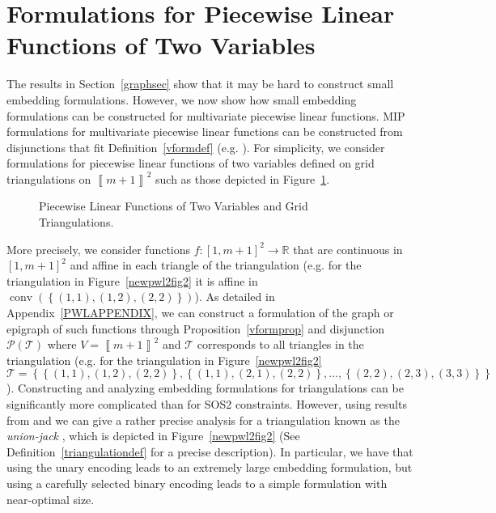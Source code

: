 \documentclass[mnsc]{informs3}
\newcommand{\set}[1]{\left\{#1\right\}}                     %
\newcommand{\bra}[1]{\left(#1\right)}
\newcommand{\sidx}[1]{\left\llbracket     #1 \right\rrbracket}
\newcommand{\Real}{\mathbb R}
\DeclareMathOperator{\conv}{conv}
\begin{document}
\section{Formulations for Piecewise Linear Functions of Two Variables}\label{pwlsecc}

The results in Section~\ref{graphsec} show that it may be hard to construct small embedding formulations. However, we now show how small embedding formulations can be constructed for multivariate piecewise linear functions. MIP formulations for multivariate piecewise linear functions can be constructed from disjunctions that fit Definition~\ref{vformdef} (e.g.  \cite{lee01,Modeling-Disjunctive-Constraints-FULL,Mixed-Integer-Models-for-Nonseparable}). For simplicity,  we consider formulations for piecewise linear functions of two variables defined on grid triangulations on $\sidx{m+1}^2$ such as those depicted in Figure~\ref{newpwl2fig}. 
\begin{figure}[htpb]
  \begin{center}
  \quad\quad\quad 
  \end{center}
  \caption{Piecewise Linear Functions of Two Variables and Grid Triangulations.}\label{newpwl2fig}
  \end{figure}
More precisely, we consider functions $f:[1,m+1]^2\to \Real$ that are continuous in $[1,m+1]^2$ and affine in each triangle of the triangulation (e.g. for the triangulation in Figure~\ref{newpwl2fig2} it is affine in $\conv\bra{\set{\bra{1,1},\bra{1,2},\bra{2,2}}}$). As detailed in Appendix~\ref{PWLAPPENDIX}, we can construct a formulation of the graph or epigraph of such functions through Proposition~\ref{vformprop} and disjunction $\mathcal{P}\bra{\mathcal{T}}$ where $V=\sidx{m+1}^2$ and $\mathcal{T}$ corresponds to all triangles in the triangulation (e.g. for the triangulation in Figure~\ref{newpwl2fig2} $\mathcal{T}=\set{\set{\bra{1,1},\bra{1,2},\bra{2,2}},\set{\bra{1,1},\bra{2,1},\bra{2,2}},\ldots, \set{\bra{2,2},\bra{2,3},\bra{3,3}}}$). Constructing and analyzing  embedding formulations for triangulations can be significantly more complicated than for SOS2 constraints. However, using results from  \cite{lee01} and \cite{Modeling-Disjunctive-Constraints-FULL} we can give a rather precise analysis for a triangulation known as the \emph{union-jack} \citep{todd77}, which is depicted in Figure~\ref{newpwl2fig2} (See Definition~\ref{triangulationdef} for a precise description). In particular, we have that using the unary encoding leads to an extremely large embedding formulation, but using a carefully selected binary encoding leads to a simple formulation with near-optimal size. 
\end{document}
